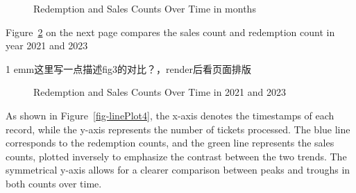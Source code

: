 \documentclass[
  letterpaper,
  DIV=11,
  numbers=noendperiod]{scrartcl}
\begin{document}
\begin{figure}[H]


\caption{\label{fig-linePlot2}Redemption and Sales Counts Over Time in
months}

\end{figure}%

Figure~\ref{fig-linePlot3} on the next page compares the sales count and
redemption count in year 2021 and 2023

1 emm这里写一点描述fig3的对比？，render后看页面排版

\begin{figure}[H]


\caption{\label{fig-linePlot3}Redemption and Sales Counts Over Time in
2021 and 2023}

\end{figure}%

As shown in Figure~\ref{fig-linePlot4}, the x-axis denotes the
timestamps of each record, while the y-axis represents the number of
tickets processed. The blue line corresponds to the redemption counts,
and the green line represents the sales counts, plotted inversely to
emphasize the contrast between the two trends. The symmetrical y-axis
allows for a clearer comparison between peaks and troughs in both counts
over time.
\end{document}
